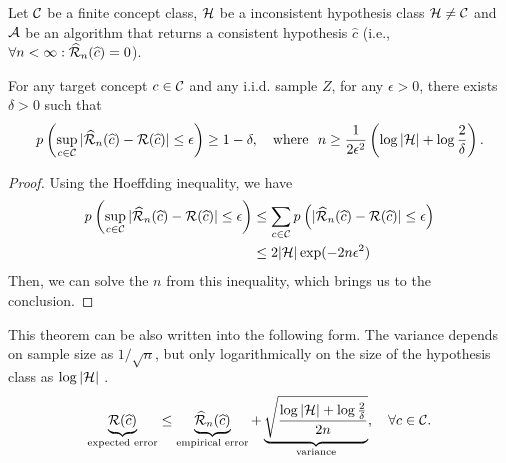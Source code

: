 \begin{theorem}
	Let $\mathcal{C}$ be a finite concept class, $\mathcal{H}$ be a inconsistent hypothesis class  $\mathcal{H} \neq \mathcal{C}$ and $\mathcal{A}$ be an algorithm that returns a consistent hypothesis $\widehat{c}$ (i.e., $\forall n < \infty: \widehat{\mathcal{R}}_n(\widehat{c}) = 0$).
	
	For any target concept $c \in \mathcal{C}$ and any i.i.d. sample $Z$, for any $\epsilon > 0$, there exists $\delta > 0$ such that
	\begin{equation}
		p_{}\left(\sup_{c \in \mathcal{C}} |\widehat{\mathcal{R}}_n(\widehat{c}) - {\mathcal{R}}(\widehat{c}) | \leq \epsilon \right) \geq 1 - \delta, \quad \text{where}\ \  n \geq \frac{1}{2\epsilon^2}\left( \log |\mathcal{H}| + \log \frac{2}{\delta} \right).
	\end{equation}
\end{theorem}
\begin{proof}
	Using the Hoeffding inequality, we have
	\begin{align}
		p_{}\left(\sup_{c \in \mathcal{C}} |\widehat{\mathcal{R}}_n(\widehat{c}) - {\mathcal{R}}(\widehat{c}) | \leq \epsilon \right) & \leq \sum_{c \in \mathcal{C}} p_{}\left(|\widehat{\mathcal{R}}_n(\widehat{c}) - {\mathcal{R}}(\widehat{c}) | \leq \epsilon \right) \\
		& \leq 2 |\mathcal{H}| \exp(-2 n \epsilon^2 )
	\end{align} 
Then, we can solve the $n$ from this inequality, which brings us to the conclusion.
\end{proof}
\remark This theorem can be also written into the following form. The variance depends on sample size as $1/\sqrt{n}$, but only logarithmically on the size of the hypothesis class as $\log |\mathcal{H}|$ .
\begin{align}
	\underbrace{{\mathcal{R}}(\widehat{c})}_\text{expected error} \leq \underbrace{\widehat{\mathcal{R}}_n(\widehat{c})}_\text{empirical error} + \underbrace{\sqrt{\frac{\log |\mathcal{H}| + \log \frac{2}{\delta}}{2n}}}_\text{variance},\quad \forall c \in \mathcal{C}.
\end{align}
